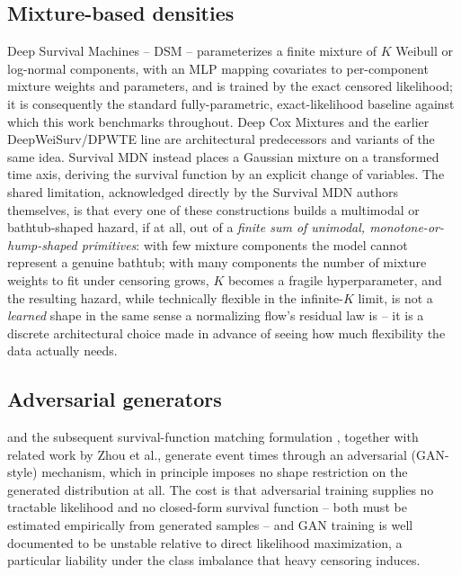 \documentclass[11pt]{article}
\begin{document}
\subsection{Mixture-based densities}
Deep Survival Machines \citep{nagpal2022dsm} -- DSM -- parameterizes a
finite mixture of $K$ Weibull or log-normal components, with an MLP
mapping covariates to per-component mixture weights and parameters, and
is trained by the exact censored likelihood; it is consequently the
standard fully-parametric, exact-likelihood baseline against which this
work benchmarks throughout. Deep Cox Mixtures \citep{nagpal2021coxmixtures}
and the earlier DeepWeiSurv/DPWTE line
\citep{bennis2020deepweisurv,bennis2021dpwte} are architectural
predecessors and variants of the same idea. Survival MDN
\citep{han2022survivalmdn} instead places a Gaussian mixture on a
transformed time axis, deriving the survival function by an explicit
change of variables. The shared limitation, acknowledged directly by the
Survival MDN authors themselves, is that every one of these constructions
builds a multimodal or bathtub-shaped hazard, if at all, out of a
\emph{finite sum of unimodal, monotone-or-hump-shaped primitives}: with
few mixture components the model cannot represent a genuine bathtub;
with many components the number of mixture weights to fit under
censoring grows, $K$ becomes a fragile hyperparameter, and the
resulting hazard, while technically flexible in the infinite-$K$ limit, is
not a \emph{learned} shape in the same sense a normalizing flow's
residual law is -- it is a discrete architectural choice made in advance
of seeing how much flexibility the data actually needs.

\subsection{Adversarial generators}
\citet{chapfuwa2018adversarial} and the subsequent survival-function
matching formulation \citep{chapfuwa2021sfm}, together with related work
by Zhou et al., generate event times through an adversarial (GAN-style)
mechanism, which in principle imposes no shape restriction on the
generated distribution at all. The cost is that adversarial training
supplies no tractable likelihood and no closed-form survival function --
both must be estimated empirically from generated samples -- and GAN
training is well documented to be unstable relative to direct
likelihood maximization, a particular liability under the class imbalance
that heavy censoring induces.
\end{document}
